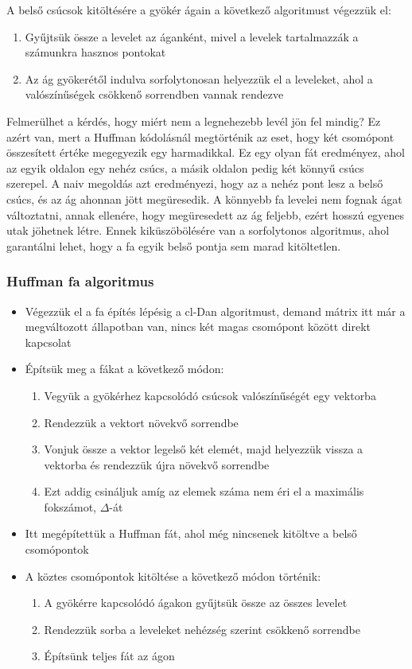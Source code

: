 \documentclass[12pt]{report}
\begin{document}
A belső csúcsok kitöltésére a gyökér ágain a következő algoritmust végezzük el:
\begin{enumerate}
	\item Gyűjtsük össze a levelet az áganként, mivel a levelek tartalmazzák a számunkra hasznos pontokat 
	\item Az ág gyökerétől indulva sorfolytonosan helyezzük el a leveleket, ahol a valószínűségek csökkenő sorrendben vannak rendezve
\end{enumerate}

Felmerülhet a kérdés, hogy miért nem a legnehezebb levél jön fel mindig?
Ez azért van, mert a Huffman kódolásnál megtörténik az eset, hogy két csomópont összesített értéke megegyezik egy harmadikkal.
Ez egy olyan fát eredményez, ahol az egyik oldalon egy nehéz csúcs, a másik oldalon pedig két könnyű csúcs szerepel.
A naiv megoldás azt eredményezi, hogy az a nehéz pont lesz a belső csúcs, és az ág ahonnan jött megüresedik.
A könnyebb fa levelei nem fognak ágat változtatni, annak ellenére, hogy megüresedett az ág feljebb, ezért hosszú egyenes utak jöhetnek létre.
Ennek kiküszöbölésére van a sorfolytonos algoritmus, ahol garantálni lehet, hogy a fa egyik belső pontja sem marad kitöltetlen.

\subsubsection{Huffman fa algoritmus}
\begin{itemize}
	\item Végezzük el a fa építés lépésig a cl-Dan algoritmust, demand mátrix itt már a megváltozott állapotban van, nincs két magas csomópont között direkt kapcsolat
	\item Építsük meg a fákat a következő módon:
	\begin{enumerate}
		\item Vegyük a gyökérhez kapcsolódó csúcsok valószínűségét egy vektorba
		\item Rendezzük a vektort növekvő sorrendbe
		\item Vonjuk össze a vektor legelső két elemét, majd helyezzük vissza a vektorba és rendezzük újra növekvő sorrendbe
		\item Ezt addig csináljuk amíg az elemek száma nem éri el a maximális fokszámot, $\Delta$-át
	\end{enumerate}
	\item Itt megépítettük a Huffman fát, ahol még nincsenek kitöltve a belső csomópontok
	\item A köztes csomópontok kitöltése a következő módon történik:
	\begin{enumerate}
		\item A gyökérre kapcsolódó ágakon gyűjtsük össze az összes levelet
		\item Rendezzük sorba a leveleket nehézség szerint csökkenő sorrendbe
		\item Építsünk teljes fát az ágon 
	\end{enumerate} 
\end{itemize}
\end{document}
